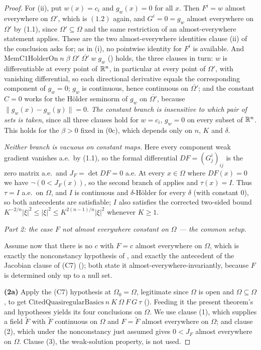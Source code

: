 \begin{proof}
For (ii), put $w(x)=c_i$ and $g_w(x)=0$ for all $x$.  Then $F^i=w$ almost
everywhere on $\Omega'$, which is $(1.2)$ again, and $G^i=0=g_w$ almost
everywhere on $\Omega'$ by (1.1), since $\Omega'\subseteq\Omega$ and the same
restriction of an almost-everywhere statement applies.  These are the two
almost-everywhere identities clause (ii) of the conclusion asks for; as in (i),
no pointwise identity for $F^i$ is available.  And
$\mathrm{MemC1HolderOn}\;n\;\beta\;\Omega'\;\overline{\Omega'}\;w\;g_w$
() holds, the three clauses in turn: $w$ is
differentiable at every point of $\mathbb{R}^n$, in particular at every point of
$\Omega'$, with vanishing differential, so each directional derivative equals
the corresponding component of $g_w=0$; $g_w$ is continuous, hence continuous on
$\overline{\Omega'}$; and the constant $C=0$ works for the H\"older seminorm of
$g_w$ on $\overline{\Omega'}$, because $\|g_w(x)-g_w(y)\|=0$.  \emph{The
constant branch is insensitive to which pair of sets is taken}, since all three
clauses hold for $w=c_i$, $g_w=0$ on every subset of $\mathbb{R}^n$.  This
holds for the $\beta>0$ fixed in (0c), which depends only on $n$, $K$ and
$\delta$.

\emph{Neither branch is vacuous on constant maps.}  Here every component weak
gradient vanishes a.e.\ by (1.1), so the formal differential $DF=(G^i_j)_{ij}$
is the zero matrix a.e.\ and $J_F=\det DF=0$ a.e.  At every $x\in\Omega$ where
$DF(x)=0$ we have $\neg(0<J_F(x))$, so the second branch of
 applies and $\tau(x)=I$.  Thus $\tau=I$ a.e.\ on
$\Omega$, and $I$ is continuous and $\delta$-H\"older for every $\delta$ (with
constant $0$), so both antecedents are satisfiable; $I$ also satisfies the
corrected two-sided bound $K^{-2/n}|\xi|^2\le|\xi|^2\le K^{2(n-1)/n}|\xi|^2$
whenever $K\ge1$.

\medskip
\noindent\emph{Part 2: the case $F$ not almost everywhere constant on $\Omega$
--- the common setup.}

Assume now that there is no $c$ with $F=c$ almost everywhere on $\Omega$, which
is exactly the nonconstancy hypothesis of
, and exactly the antecedent of the Jacobian
clause of (C7) (); both state it
almost-everywhere-invariantly, because $F$ is determined only up to a null set.

\textbf{(2a)} Apply the (C7) hypothesis at $\Omega_0=\Omega$, legitimate since
$\Omega$ is open and $\Omega\subseteq\Omega$, to get
$\mathrm{CitedQuasiregularBasics}\ n\ K\ \Omega\ F\ G\ \tau$
().  Feeding it the present theorem's
 and  hypotheses yields its
four conclusions on $\Omega$.  We use clause (1), which supplies a field
$\widetilde F$ with $\widetilde F$ continuous on $\Omega$ and $F=\widetilde F$
almost everywhere on $\Omega$; and clause (2), which under the nonconstancy just
assumed gives $0<J_F$ almost everywhere on $\Omega$.  Clause (3), the
weak-solution property, is not used.


\end{proof}
